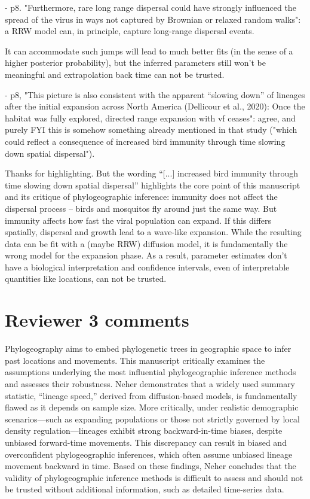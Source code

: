 \documentclass[11pt, oneside]{article}   	%
\newcommand{\response}[1]{{\color{black}{\bf Response:} #1}}
\begin{document}
- p8. "Furthermore, rare long range dispersal could have strongly influenced the spread of the virus in ways not captured by Brownian or relaxed random walks": a RRW model can, in principle, capture long-range dispersal events.

\response{It can accommodate such jumps will lead to much better fits (in the sense of a higher posterior probability), but the inferred parameters still won't be meaningful and extrapolation back time can not be trusted. }

- p8, "This picture is also consistent with the apparent “slowing down” of lineages after the initial expansion across North America (Dellicour et al., 2020): Once the habitat was fully explored, directed range expansion with vf ceases": agree, and purely FYI this is somehow something already mentioned in that study ("which could reflect a consequence of increased bird immunity through time slowing down spatial dispersal").

\response{Thanks for highlighting. But the wording ``[...] increased bird immunity through time slowing down spatial dispersal'' highlights the core point of this manuscript and its critique of phylogeographic inference: immunity does not affect the dispersal process -- birds and mosquitos fly around just the same way. But immunity affects how fast the viral population can expand. If this differs spatially, dispersal and growth lead to a wave-like expansion. While the resulting data can be fit with a (maybe RRW) diffusion model, it is fundamentally the wrong model for the expansion phase. As a result, parameter estimates don't have a biological interpretation and confidence intervals, even of interpretable quantities like locations, can not be trusted.}



\section*{Reviewer 3 comments}

Phylogeography aims to embed phylogenetic trees in geographic space to infer past locations and movements. This manuscript critically examines the assumptions underlying the most influential phylogeographic inference methods and assesses their robustness. Neher demonstrates that a widely used summary statistic, “lineage speed,” derived from diffusion-based models, is fundamentally flawed as it depends on sample size. More critically, under realistic demographic scenarios—such as expanding populations or those not strictly governed by local density regulation—lineages exhibit strong backward-in-time biases, despite unbiased forward-time movements. This discrepancy can result in biased and overconfident phylogeographic inferences, which often assume unbiased lineage movement backward in time. Based on these findings, Neher concludes that the validity of phylogeographic inference methods is difficult to assess and should not be trusted without additional information, such as detailed time-series data.
\end{document}
